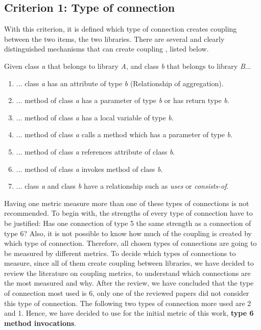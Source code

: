 \documentclass[a4paper]{article}
\begin{document}
\subsection{Criterion 1: Type of connection}
With this criterion, it is defined which type of connection creates coupling between the two items, the two libraries. There are several and clearly distinguished mechanisms that can create coupling \cite{briand1999unified}, listed below.

Given class \textit{a} that belongs to library \textit{A}, and class \textit{b} that belongs to library \textit{B}...

\begin{enumerate}[noitemsep,leftmargin=*]
  \item ... class \textit{a} has an attribute of type \textit{b} (Relationship of aggregation).
  \item ... method of class \textit{a} has a parameter of type \textit{b} or has return type \textit{b}.
  \item ... method of class \textit{a} has a local variable of type \textit{b}.
  \item ... method of class \textit{a} calls a method which has a parameter of type \textit{b}.
  \item ... method of class \textit{a} references attribute of class \textit{b}.
  \item ... method of class \textit{a} invokes method of class \textit{b}.
  \item ... class \textit{a} and class \textit{b} have a relationship such as \textit{uses} or \textit{consists-of}.
\end{enumerate}

Having one metric measure more than one of these types of connections is not recommended. To begin with, the strengths of every type of connection have to be justified: Has one connection of type 5 the same strength as a connection of type 6? Also, it is not possible to know how much of the coupling is created by which type of connection. Therefore, all chosen types of connections are going to be measured by different metrics. To decide which types of connections to measure, since all of them create coupling between libraries, we have decided to review the literature on coupling metrics, to understand which connections are the most measured and why. After the review, we have concluded that the type of connection most used is 6, only one of the reviewed papers did not consider this type of connection. The following two types of connection more used are 2 and 1. Hence, we have decided to use for the initial metric of this work, \textbf{type 6 method invocations}.
\end{document}
